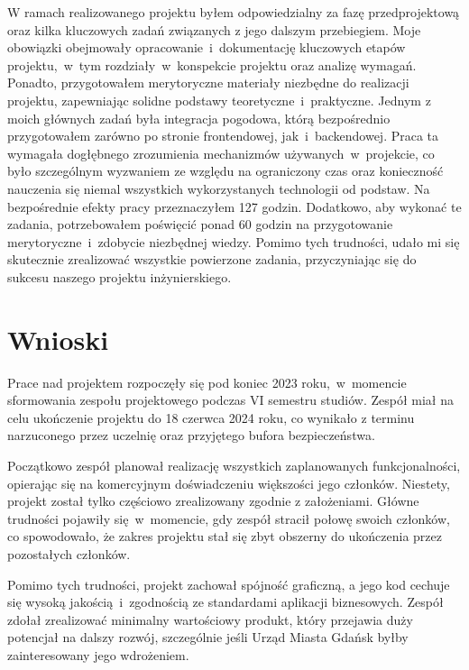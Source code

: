 W ramach realizowanego projektu byłem odpowiedzialny za fazę przedprojektową oraz kilka kluczowych zadań związanych z jego dalszym przebiegiem.\newline
Moje obowiązki obejmowały opracowanie~i~dokumentację kluczowych etapów projektu,~w~tym rozdziały~w~konspekcie projektu oraz analizę wymagań. \newline
Ponadto, przygotowałem merytoryczne materiały niezbędne do realizacji projektu, zapewniając solidne podstawy teoretyczne~i~praktyczne. \newline
Jednym z moich głównych zadań była integracja pogodowa, którą bezpośrednio przygotowałem zarówno po stronie frontendowej, jak~i~backendowej.\newline
\indent Praca ta wymagała dogłębnego zrozumienia mechanizmów używanych~w~projekcie, co było szczególnym wyzwaniem ze względu na ograniczony czas oraz konieczność nauczenia się niemal wszystkich wykorzystanych technologii od podstaw.
Na bezpośrednie efekty pracy przeznaczyłem 127 godzin. Dodatkowo, aby wykonać te zadania, potrzebowałem poświęcić ponad 60 godzin na przygotowanie merytoryczne~i~zdobycie niezbędnej wiedzy.\newline
Pomimo tych trudności, udało mi się skutecznie zrealizować wszystkie powierzone zadania, przyczyniając się do sukcesu naszego projektu inżynierskiego.

\section{Wnioski}\label{sec:wnioski}
Prace nad projektem rozpoczęły się pod koniec 2023 roku,~w~momencie sformowania zespołu projektowego podczas VI semestru studiów.
Zespół miał na celu ukończenie projektu do 18 czerwca 2024 roku, co wynikało z terminu narzuconego przez uczelnię oraz przyjętego bufora bezpieczeństwa.

Początkowo zespół planował realizację wszystkich zaplanowanych funkcjonalności, opierając się na komercyjnym doświadczeniu większości jego członków.
Niestety, projekt został tylko częściowo zrealizowany zgodnie z założeniami.
Główne trudności pojawiły się~w~momencie, gdy zespół stracił połowę swoich członków, co spowodowało, że zakres projektu stał się zbyt obszerny do ukończenia przez pozostałych członków.

Pomimo tych trudności, projekt zachował spójność graficzną, a jego kod cechuje się wysoką jakością~i~zgodnością ze standardami aplikacji biznesowych.
Zespół zdołał zrealizować minimalny wartościowy produkt, który przejawia duży potencjał na dalszy rozwój, szczególnie jeśli Urząd Miasta Gdańsk byłby zainteresowany jego wdrożeniem.

